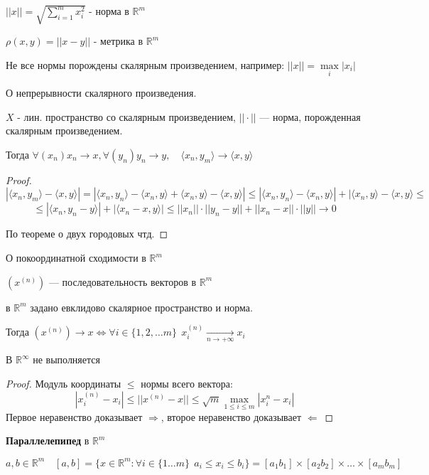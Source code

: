 $||x|| = \sqrt{\sum\limits_{i=1}^m x_i^2}$ - норма в $\mathbb{R}^m$

$\rho(x,y)=||x-y||$ - метрика в $\mathbb{R}^m$

Не все нормы порождены скалярным произведением, например: $||x||=\max\limits_i |x_i|$

\begin{lemma}
    О непрерывности скалярного произведения.

    $X$ - лин. пространство со скалярным произведением, $||\cdot||$ --- норма, порожденная скалярным произведением.

    Тогда $\forall (x_n) x_n\to x, \forall (y_n) y_n\to y, \quad \langle x_n,y_m\rangle\to\langle x,y\rangle$
\end{lemma}

\begin{proof}
    $$|\langle x_n,y_m\rangle - \langle x,y\rangle|=|\langle x_n,y_n\rangle - \langle x_n,y\rangle + \langle x_n,y\rangle - \langle x,y\rangle|\leq|\langle x_n,y_n\rangle-\langle x_n,y\rangle| + |\langle x_n,y\rangle-\langle x,y\rangle\leq$$
    $$\leq |\langle x_n,y_n-y\rangle| + |\langle x_n-x,y\rangle|\leq ||x_n||\cdot||y_n-y||+||x_n-x||\cdot||y|| \to 0$$

    По теореме о двух городовых чтд.
\end{proof}

\begin{lemma}
    О покоординатной сходимости в $\mathbb{R}^m$

    $(x^{(n)})$ --- последовательность векторов в $\mathbb{R}^m$
    
    в $\mathbb{R}^m$ задано евклидово скалярное пространство и норма.

    Тогда $(x^{(n)})\to x \Leftrightarrow \forall i\in\{1,2,\ldots m\} \ \ x_i^{(n)}\underset{n\to+\infty}\to x_i$
\end{lemma}

\begin{remark}
    В $\mathbb{R}^{\infty}$ не выполняется
\end{remark}

\begin{proof}
    Модуль координаты $\leq$ нормы всего вектора:
    $$|x_i^{(n)}-x_i|\leq ||x^{(n)}-x||\leq \sqrt{m}\max\limits_{1\leq i\leq m} |x_i^{n}-x_i|$$
    Первое неравенство доказывает $\Rightarrow$, второе неравенство доказывает $\Leftarrow$
\end{proof}

\begin{definition}
    \textbf{Параллелепипед} в $\mathbb{R}^m$

    $a,b\in\mathbb{R}^m \quad [a,b]=\{x \in\mathbb{R}^m : \forall i\in\{1\ldots m\} \ \ a_i\leq x_i\leq b_i \} = [a_1b_1]\times[a_2b_2]\times\ldots\times[a_mb_m]$
\end{definition}

